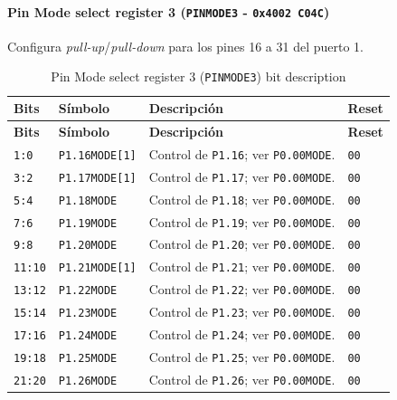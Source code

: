 \paragraph{Pin Mode select register 3 (\texttt{PINMODE3} - \texttt{0x4002 C04C})}
Configura \textit{pull-up}/\textit{pull-down} para los pines 16 a 31 del puerto 1.

\begin{longtable}{|>{\raggedright\arraybackslash}p{}|>{\raggedright\arraybackslash}p{}|>{\raggedright\arraybackslash}p{}|>{\centering\arraybackslash}p{}|}
\caption{Pin Mode select register 3 (\texttt{PINMODE3}) bit description}\\
\hline
\textbf{Bits} & \textbf{Símbolo} & \textbf{Descripción} & \textbf{Reset} \\
\hline
\endfirsthead
\hline
\textbf{Bits} & \textbf{Símbolo} & \textbf{Descripción} & \textbf{Reset} \\
\hline
\endhead
\texttt{1:0} & \texttt{P1.16MODE[1]} & Control de \texttt{P1.16}; ver \texttt{P0.00MODE}. & \texttt{00} \\
\hline
\texttt{3:2} & \texttt{P1.17MODE[1]} & Control de \texttt{P1.17}; ver \texttt{P0.00MODE}. & \texttt{00} \\
\hline
\texttt{5:4} & \texttt{P1.18MODE} & Control de \texttt{P1.18}; ver \texttt{P0.00MODE}. & \texttt{00} \\
\hline
\texttt{7:6} & \texttt{P1.19MODE} & Control de \texttt{P1.19}; ver \texttt{P0.00MODE}. & \texttt{00} \\
\hline
\texttt{9:8} & \texttt{P1.20MODE} & Control de \texttt{P1.20}; ver \texttt{P0.00MODE}. & \texttt{00} \\
\hline
\texttt{11:10} & \texttt{P1.21MODE[1]} & Control de \texttt{P1.21}; ver \texttt{P0.00MODE}. & \texttt{00} \\
\hline
\texttt{13:12} & \texttt{P1.22MODE} & Control de \texttt{P1.22}; ver \texttt{P0.00MODE}. & \texttt{00} \\
\hline
\texttt{15:14} & \texttt{P1.23MODE} & Control de \texttt{P1.23}; ver \texttt{P0.00MODE}. & \texttt{00} \\
\hline
\texttt{17:16} & \texttt{P1.24MODE} & Control de \texttt{P1.24}; ver \texttt{P0.00MODE}. & \texttt{00} \\
\hline
\texttt{19:18} & \texttt{P1.25MODE} & Control de \texttt{P1.25}; ver \texttt{P0.00MODE}. & \texttt{00} \\
\hline
\texttt{21:20} & \texttt{P1.26MODE} & Control de \texttt{P1.26}; ver \texttt{P0.00MODE}. & \texttt{00} \\

\end{longtable}
